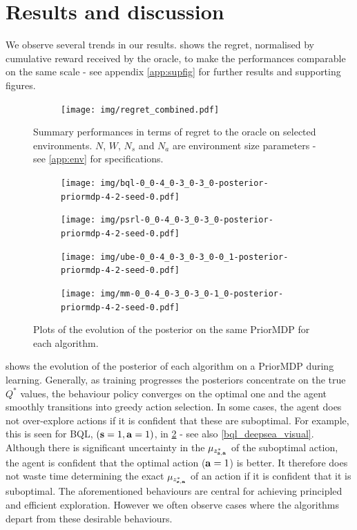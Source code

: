 \documentclass{article}
\begin{document}
\section{Results and discussion}

We observe several trends in our results.  shows the regret, normalised by cumulative reward received by the oracle, to make the performances comparable on the same scale - see appendix \ref{app:supfig} for further results and supporting figures.
\begin{figure}[h!]
\centering
\begin{subfigure}{1.\textwidth}
\texttt{[image: img/regret\_combined.pdf]}
\end{subfigure}
\captionsetup{width=0.9\linewidth}
\caption{Summary performances in terms of regret to the oracle on selected environments. $N$, $W$, $N_s$ and $N_a$ are environment size parameters - see \cref{app:env} for specifications.}\label{combined_regret_summary}
\end{figure}
\begin{figure}[h!]
\centering
\begin{subfigure}{0.49\textwidth}
\texttt{[image: img/bql-0\_0-4\_0-3\_0-3\_0-posterior-priormdp-4-2-seed-0.pdf]}
\end{subfigure}
\begin{subfigure}{0.49\textwidth}
\texttt{[image: img/psrl-0\_0-4\_0-3\_0-3\_0-posterior-priormdp-4-2-seed-0.pdf]}
\end{subfigure}
\begin{subfigure}{0.49\textwidth}
\texttt{[image: img/ube-0\_0-4\_0-3\_0-3\_0-0\_1-posterior-priormdp-4-2-seed-0.pdf]}
\end{subfigure}
\begin{subfigure}{0.49\textwidth}
\texttt{[image: img/mm-0\_0-4\_0-3\_0-3\_0-1\_0-posterior-priormdp-4-2-seed-0.pdf]}
\end{subfigure}
\captionsetup{width=0.9\linewidth}
\caption{Plots of the evolution of the posterior on the same PriorMDP for each algorithm.}\label{combined_posterior_evolution}
\end{figure}
 shows the evolution of the posterior of each algorithm on a PriorMDP during learning. Generally, as training progresses the posteriors concentrate on the true $Q^*$ values, the behaviour policy converges on the optimal one and the agent smoothly transitions into greedy action selection. In some cases, the agent does not over-explore actions if it is confident that these are suboptimal. For example, this is seen for BQL, $(\mathbf{s} = 1, \mathbf{a} = 1)$, in \cref{combined_posterior_evolution} - see also \cref{bql_deepsea_visual}. Although there is significant uncertainty in the $\mu_{z^*_{\mathbf{s}, \mathbf{a}}}$ of the suboptimal action, the agent is confident that the optimal action ($\mathbf{a} = 1$) is better. It therefore does not waste time determining the exact $\mu_{z^*_{\mathbf{s}, \mathbf{a}}}$ of an action if it is confident that it is suboptimal. The aforementioned behaviours are central for achieving principled and efficient exploration. However we often observe cases where the algorithms depart from these desirable behaviours.
\end{document}
